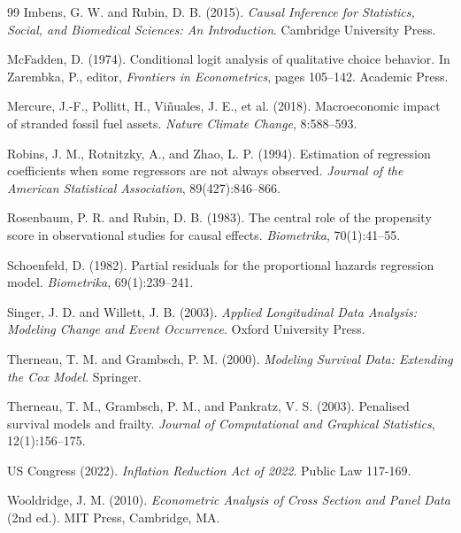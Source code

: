 \documentclass[review,authoryear,11pt]{elsarticle}
\begin{document}
\begin{thebibliography}{99}
Imbens, G. W. and Rubin, D. B. (2015). \textit{Causal Inference for Statistics, Social, and Biomedical Sciences: An Introduction}. Cambridge University Press.

McFadden, D. (1974). Conditional logit analysis of qualitative choice behavior. In Zarembka, P., editor, \textit{Frontiers in Econometrics}, pages 105--142. Academic Press.

Mercure, J.-F., Pollitt, H., Vi\~{n}uales, J. E., et al. (2018). Macroeconomic impact of stranded fossil fuel assets. \textit{Nature Climate Change}, 8:588--593.

Robins, J. M., Rotnitzky, A., and Zhao, L. P. (1994). Estimation of regression coefficients when some regressors are not always observed. \textit{Journal of the American Statistical Association}, 89(427):846--866.

Rosenbaum, P. R. and Rubin, D. B. (1983). The central role of the propensity score in observational studies for causal effects. \textit{Biometrika}, 70(1):41--55.

Schoenfeld, D. (1982). Partial residuals for the proportional hazards regression model. \textit{Biometrika}, 69(1):239--241.

Singer, J. D. and Willett, J. B. (2003). \textit{Applied Longitudinal Data Analysis: Modeling Change and Event Occurrence}. Oxford University Press.

Therneau, T. M. and Grambsch, P. M. (2000). \textit{Modeling Survival Data: Extending the Cox Model}. Springer.

Therneau, T. M., Grambsch, P. M., and Pankratz, V. S. (2003). Penalised survival models and frailty. \textit{Journal of Computational and Graphical Statistics}, 12(1):156--175.

US Congress (2022). \textit{Inflation Reduction Act of 2022}. Public Law 117-169.

Wooldridge, J. M. (2010). \textit{Econometric Analysis of Cross Section and Panel Data} (2nd ed.). MIT Press, Cambridge, MA.

\end{thebibliography}
\end{document}

